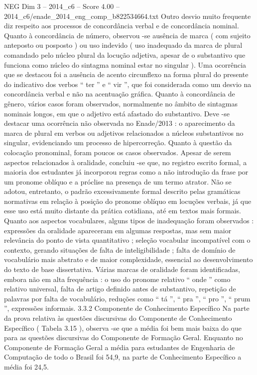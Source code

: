 \begin{textsample}{NEG Dim 3 – 2014\_c6 – Score 4.00 – 2014\_c6/enade\_2014\_eng\_comp\_b822534664.txt}
Outro desvio muito frequente diz respeito aos processos de concordância verbal e de concordância nominal.
Quanto à concordância de número, observou -se ausência de marca ( com sujeito anteposto ou posposto ) ou uso indevido ( uso inadequado da marca de plural comandado pelo núcleo plural da locução adjetiva, apesar de o substantivo que funciona como núcleo do sintagma nominal estar no singular ).
Uma ocorrência que se destacou foi a ausência de acento circunflexo na forma plural do presente do indicativo dos verbos “ ter ” e “ vir ”, que foi considerada como um desvio na concordância verbal e não na acentuação gráfica.
Quanto à concordância de gênero, vários casos foram observados, normalmente no âmbito de sintagmas nominais longos, em que o adjetivo está afastado do substantivo.
Deve -se destacar uma ocorrência não observada no Enade/2013 : o aparecimento da marca de plural em verbos ou adjetivos relacionados a núcleos substantivos no singular, evidenciando um processo de hipercorreção.
Quanto à questão da colocação pronominal, foram poucos os casos observados.
Apesar de serem aspectos relacionados à oralidade, concluiu -se que, no registro escrito formal, a maioria dos estudantes já incorporou regras como a não introdução da frase por um pronome oblíquo e a próclise na presença de um termo atrator.
Não se adotou, entretanto, o padrão excessivamente formal descrito pelas gramáticas normativas em relação à posição do pronome oblíquo em locuções verbais, já que esse uso está muito distante da prática cotidiana, até em textos mais formais.
Quanto aos aspectos vocabulares, alguns tipos de inadequação foram observados : expressões da oralidade apareceram em algumas respostas, mas sem maior relevância do ponto de vista quantitativo ; seleção vocabular incompatível com o contexto, gerando situações de falta de inteligibilidade ; falta de domínio de vocabulário mais abstrato e de maior complexidade, essencial ao desenvolvimento do texto de base dissertativa.
Várias marcas de oralidade foram identificadas, embora não em alta frequência : o uso do pronome relativo “ onde ” como relativo universal, falta de artigo definido antes de substantivo, repetição de palavras por falta de vocabulário, reduções como “ tá ”, “ pra ”, “ pro ”, “ prum ”, expressões informais. 3.3.2 Componente de Conhecimento Específico Na parte da prova relativa às questões discursivas do Componente de Conhecimento Específico ( Tabela 3.15 ), observa -se que a média foi bem mais baixa do que para as questões discursivas do Componente de Formação Geral.
Enquanto no Componente de Formação Geral a média para estudantes de Engenharia de Computação de todo o Brasil foi 54,9, na parte de Conhecimento Específico a média foi 24,5.

\end{textsample}
